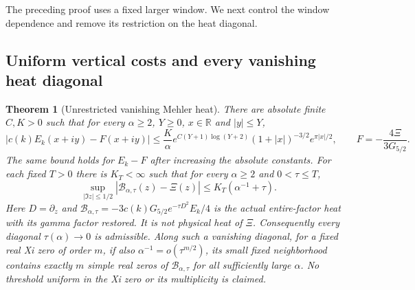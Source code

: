 \documentclass[11pt]{article}
\newtheorem{theorem}{Theorem}
\theoremstyle{remark}\newtheorem{remark}[theorem]{Remark}
\newcommand{\R}{\mathbb R}
\begin{document}
The preceding proof uses a fixed larger window. We next control the
window dependence and remove its restriction on the heat diagonal.

\subsection{Uniform vertical costs and every vanishing heat diagonal}

\begin{theorem}[Unrestricted vanishing Mehler heat]
\label{thm:unrestricted-mehler-heat}
There are absolute finite $C,K>0$ such that for every $\alpha\ge2$,
$Y\ge0$, $x\in\R$ and $|y|\le Y$,
\[
 |c(k)E_k(x+iy)-F(x+iy)|
 \le\frac K\alpha e^{C(Y+1)\log(Y+2)}
              (1+|x|)^{-3/2}e^{\pi|x|/2},
 \qquad F=-\frac{4\Xi}{3G_{5/2}}.                 \tag{UVH1}
\]
The same bound holds for $E_k-F$ after increasing the absolute
constants. For each fixed $T>0$ there is $K_T<\infty$ such that
for every $\alpha\ge2$ and $0<\tau\le T$,
\[
 \sup_{|\Im z|\le1/2}
       |\mathcal B_{\alpha,\tau}(z)-\Xi(z)|
                         \le K_T(\alpha^{-1}+\tau).       \tag{UVH2}
\]
Here $D=\partial_z$ and $\mathcal B_{\alpha,\tau}=-3c(k)G_{5/2}
e^{-\tau D^2}E_k/4$ is the actual entire-factor heat with its
gamma factor restored. It is not physical heat of $\Xi$.
Consequently every diagonal $\tau(\alpha)\to0$ is admissible.
Along such a vanishing diagonal, for a fixed real Xi zero of order $m$, if also
$\alpha^{-1}=o(\tau^{m/2})$, its small fixed neighborhood
contains exactly $m$ simple real zeros of
$\mathcal B_{\alpha,\tau}$ for all sufficiently large $\alpha$.
No threshold uniform in the Xi zero or its multiplicity is claimed.
\end{theorem}
\end{document}
